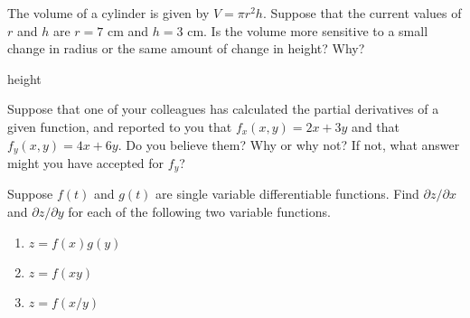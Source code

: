 \begin{enumialphparenastyle}
\begin{ex}
	The volume of a cylinder is given by $V=\pi r^2 h$.
	Suppose that the current values of $r$ and $h$ are $r=7$ cm and $h=3$ cm. Is
	the volume more sensitive to a small change in radius or the same amount of
	change in height? Why?
	\begin{sol}
		height
	\end{sol}
\end{ex}

\begin{ex}
Suppose that one of your colleagues has calculated the partial
  derivatives of a given function, and reported to you that
  $f_x(x,y)=2x+3y$ and that $f_y(x,y)=4x+6y$.  Do you believe them?
  Why or why not?  If not, what answer might you have accepted for
  $f_y$?
\end{ex}

\begin{ex}
Suppose $f(t)$ and $g(t)$ are single variable differentiable
  functions.  Find $\partial z/\partial x$ and
  $\partial z/\partial y$ for each of the following two variable functions.
\begin{enumerate}
	\item $z=f(x)g(y)$
	\item $z=f(xy)$
	\item $z=f(x/y)$
\end{enumerate}
\end{ex}

\end{enumialphparenastyle}